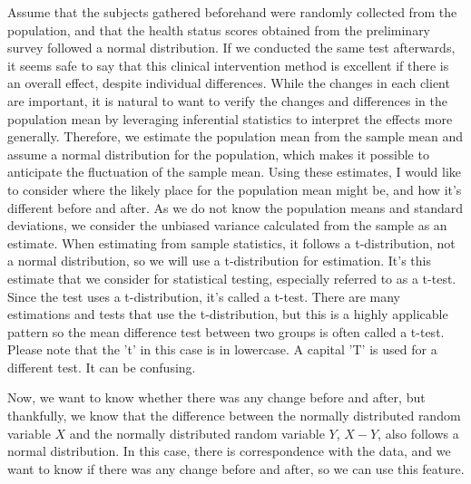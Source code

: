 \documentclass{ltjsarticle}
\begin{document}
Assume that the subjects gathered beforehand were randomly collected from the population, and that the health status scores obtained from the preliminary survey followed a normal distribution. If we conducted the same test afterwards, it seems safe to say that this clinical intervention method is excellent if there is an overall effect, despite individual differences. While the changes in each client are important, it is natural to want to verify the changes and differences in the population mean by leveraging inferential statistics to interpret the effects more generally. Therefore, we estimate the population mean from the sample mean and assume a normal distribution for the population, which makes it possible to anticipate the fluctuation of the sample mean. Using these estimates, I would like to consider where the likely place for the population mean might be, and how it's different before and after. As we do not know the population means and standard deviations, we consider the unbiased variance calculated from the sample as an estimate. When estimating from sample statistics, it follows a t-distribution, not a normal distribution, so we will use a t-distribution for estimation. It's this estimate that we consider for statistical testing, especially referred to as a t-test. Since the test uses a t-distribution, it's called a t-test. There are many estimations and tests that use the t-distribution, but this is a highly applicable pattern so the mean difference test between two groups is often called a t-test. Please note that the 't' in this case is in lowercase. A capital 'T' is used for a different test. It can be confusing.


Now, we want to know whether there was any change before and after, but thankfully, we know that the difference between the normally distributed random variable $X$ and the normally distributed random variable $Y$, $X-Y$, also follows a normal distribution. In this case, there is correspondence with the data, and we want to know if there was any change before and after, so we can use this feature.
\end{document}
